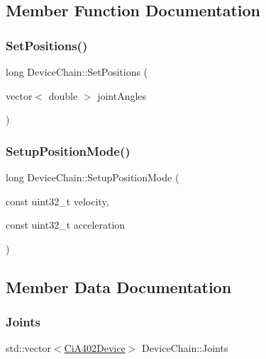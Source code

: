 \subsection{Member Function Documentation}
\mbox{\label{classDeviceChain_ae6e9be5bfb46721d4c6b66d3d9541f25}} 
\subsubsection{\texorpdfstring{Set\+Positions()}{SetPositions()}}
{\footnotesize\ttfamily long Device\+Chain\+::\+Set\+Positions (\begin{DoxyParamCaption}\item[{vector$<$ double $>$}]{joint\+Angles }\end{DoxyParamCaption})}

\mbox{\label{classDeviceChain_a329b622f12a419f01a9bab38f869144b}} 
\subsubsection{\texorpdfstring{Setup\+Position\+Mode()}{SetupPositionMode()}}
{\footnotesize\ttfamily long Device\+Chain\+::\+Setup\+Position\+Mode (\begin{DoxyParamCaption}\item[{const uint32\+\_\+t}]{velocity,  }\item[{const uint32\+\_\+t}]{acceleration }\end{DoxyParamCaption})}



\subsection{Member Data Documentation}
\mbox{\label{classDeviceChain_a114bea9dc1166ab2ea5a9ef7488c66ab}} 
\subsubsection{\texorpdfstring{Joints}{Joints}}
{\footnotesize\ttfamily std\+::vector$<$\hyperlink{classCiA402Device}{Ci\+A402\+Device}$>$ Device\+Chain\+::\+Joints\hspace{0.3cm}{\ttfamily [private]}}

